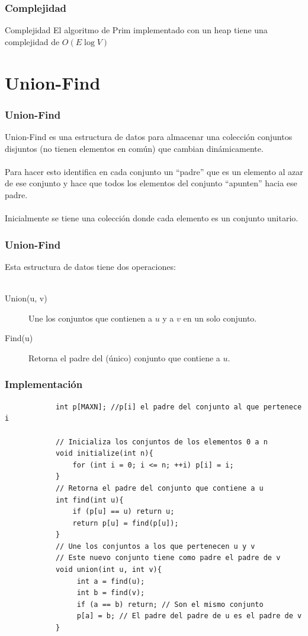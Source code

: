 \documentclass{beamer}
\begin{document}
	\begin{frame}
		\frametitle{Complejidad}
		\begin{block}{Complejidad}
			El algoritmo de Prim implementado con un heap tiene una complejidad de $O(E\operatorname{log} V)$
		\end{block}
	\end{frame}

\section[Union-Find]{Union-Find}
	\begin{frame}[fragile]
		\frametitle{Union-Find}
		Union-Find es una estructura de datos para almacenar una colección conjuntos disjuntos (no tienen elementos en común) que cambian dinámicamente. \\ \quad \\
		Para hacer esto identifica en cada conjunto un ``padre'' que es un elemento al azar de ese conjunto y hace que todos los elementos del conjunto ``apunten'' hacia ese padre. \\ \quad \\
		Inicialmente se tiene una colección donde cada elemento es un conjunto unitario.
	\end{frame}
	
	\begin{frame}
		\frametitle{Union-Find}
		Esta estructura de datos tiene dos operaciones: \\ \quad \\
		\begin{description}
			\item[Union(u, v)] Une los conjuntos que contienen a $u$ y a $v$ en un solo conjunto.
			\item[Find(u)] Retorna el padre del (único) conjunto que contiene a $u$.
		\end{description}
	\end{frame}
	
	\begin{frame}[fragile]
		\frametitle{Implementación}
		\begin{lstlisting}
			int p[MAXN]; //p[i] el padre del conjunto al que pertenece i
			
			// Inicializa los conjuntos de los elementos 0 a n
			void initialize(int n){
			    for (int i = 0; i <= n; ++i) p[i] = i;
			}
			// Retorna el padre del conjunto que contiene a u
			int find(int u){
			    if (p[u] == u) return u;
			    return p[u] = find(p[u]);
			}
			// Une los conjuntos a los que pertenecen u y v
			// Este nuevo conjunto tiene como padre el padre de v
			void union(int u, int v){
			     int a = find(u);
			     int b = find(v);
			     if (a == b) return; // Son el mismo conjunto
			     p[a] = b; // El padre del padre de u es el padre de v
			}
		\end{lstlisting}
	\end{frame}
	
\end{document}
